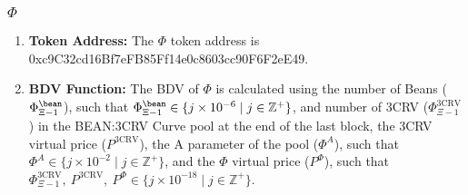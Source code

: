 \documentclass[class=article, crop=false]{standalone}
\begin{document}
\subsubsection{$\Phi$}
    \begin{enumerate}
        \item \textbf{Token Address:} The $\Phi$ token address is 0xc9C32cd16Bf7eFB85Ff14e0c8603cc90F6F2eE49.
        \item \textbf{BDV Function:} The BDV of $\Phi$ is calculated using the number of Beans ($\Phi_{\Xi-1}^{\bean}$), such that $\Phi_{\Xi-1}^{\bean} \in \{j \times 10^{-6} \mid j \in \mathbb{Z}^{+} \}$, and number of 3CRV ($\Phi_{\Xi-1}^{\text{3CRV}}$) in the BEAN:3CRV Curve pool at the end of the last block, the 3CRV virtual price ($P^{\text{3CRV}}$), the A parameter of the pool ($\Phi^{A}$), such that $\Phi^{A} \in \{j \times 10^{-2} \mid j \in \mathbb{Z}^{+} \}$, and the $\Phi$ virtual price ($P^{\Phi}$), such that $\Phi_{\Xi-1}^{\text{3CRV}},\  P^{\text{3CRV}},\ P^{\Phi}\in \{j \times 10^{-18} \mid j \in \mathbb{Z}^{+} \}$. 


\end{enumerate}
\end{document}
